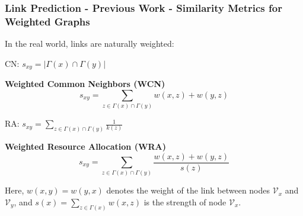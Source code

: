 \documentclass[9pt]{beamer}
\begin{document}
\begin{frame}
\frametitle{Link Prediction - Previous Work - Similarity Metrics for Weighted Graphs}

In the real world, links are naturally weighted:

CN: $s_{xy}=|\Gamma(x)\cap\Gamma(y)|$

\textbf{Weighted Common Neighbors (WCN)}
\begin{equation}
s_{xy}=\sum_{z\in \Gamma(x)\cap\Gamma(y)}w(x,z)+w(y,z)
\end{equation}

RA: $s_{xy}=\sum_{z\in \Gamma(x)\cap\Gamma(y)}\frac{1}{k(z)}$

\textbf{Weighted Resource Allocation (WRA)}
\begin{equation}
s_{xy}=\sum_{z\in \Gamma(x)\cap\Gamma(y)}\frac{w(x,z)+w(y,z)}{s(z)}
\end{equation}

Here, $w(x, y) = w(y, x)$ denotes the weight of the link between nodes $\mathcal{V}_x$ and $\mathcal{V}_y$, and $s(x)=\sum_{z\in\Gamma(x)}w(x,z)$ is the strength of node $\mathcal{V}_x$.
\end{frame}
\end{document}
